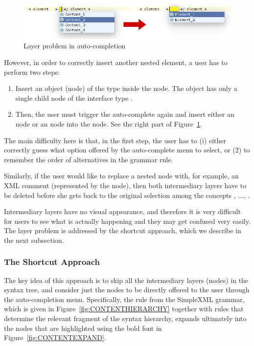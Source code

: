 \begin{figure}[ht]
	\centering
	\includegraphics[scale=0.5]{./images/layer_problem.png}
	\caption{Layer problem in auto-completion}
	\label{fig:LAYERPROBLEM}
\end{figure}

However, in order to correctly insert another nested element, a user has to perform two steps:
\begin{enumerate}
	\item Insert an object (node) of the type  inside the  node. The  object has only a single child node of the interface type .
	\item Then, the user must trigger the auto-complete again and insert either an  node or an  node into the  node. See the right part of Figure~\ref{fig:LAYERPROBLEM}.
\end{enumerate}
The main difficulty here is that, in the first step, the user has to (i) either correctly guess what option offered by the auto-complete menu to select, or (2) to remember the order of alternatives in the grammar rule.

Similarly, if the user would like to replace a nested  node with, for example, an XML comment (represented by the  node), then both intermediary layers have to be deleted before she gets back to the original selection among the concepts , $\ldots$, .

Intermediary layers have no visual appearance, and therefore it is very difficult for users to see what is actually happening and they may get confused very easily.
The layer problem is addressed by the shortcut approach, which we describe in the next subsection.

\subsubsection{The Shortcut Approach}
\label{sect:SHORTCUT}

The key idea of this approach is to skip all the intermediary layers (nodes) in the syntax tree, and consider just the nodes to be directly offered to the user through the auto-completion menu.
Specifically, the  rule from the SimpleXML grammar, which is given in Figure~\ref{fig:CONTENTHIERARCHY} together with rules that determine the relevant fragment of the syntax hierarchy, expands ultimately into the nodes that are highlighted using the bold font in Figure~\ref{fig:CONTENTEXPAND}.

